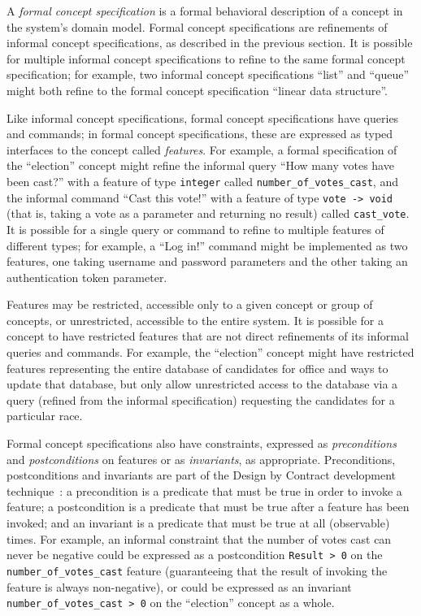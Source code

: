 A \emph{formal concept specification} is a formal behavioral
description of a concept in the system's domain model. Formal concept
specifications are refinements of informal concept specifications, as
described in the previous section. It is possible for multiple
informal concept specifications to refine to the same formal concept
specification; for example, two informal concept specifications
``list'' and ``queue'' might both refine to the formal concept
specification ``linear data structure''.

Like informal concept specifications, formal concept specifications
have queries and commands; in formal concept specifications, these are
expressed as typed interfaces to the concept called
\emph{features}. For example, a formal specification of the
``election'' concept might refine the informal query ``How many votes
have been cast?'' with a feature of type \texttt{integer} called
\texttt{number\_of\_votes\_cast}, and the informal command ``Cast this
vote!'' with a feature of type \texttt{vote -> void} (that is, taking
a vote as a parameter and returning no result) called
\texttt{cast\_vote}. It is possible for a single query or command to
refine to multiple features of different types; for example, a ``Log
in!''  command might be implemented as two features, one taking
username and password parameters and the other taking an
authentication token parameter.

Features may be restricted, accessible only to a given concept or
group of concepts, or unrestricted, accessible to the entire
system. It is possible for a concept to have restricted features that
are not direct refinements of its informal queries and commands. For
example, the ``election'' concept might have restricted features
representing the entire database of candidates for office and ways to
update that database, but only allow unrestricted access to the
database via a query (refined from the informal specification)
requesting the candidates for a particular race.

Formal concept specifications also have constraints, expressed as
\emph{preconditions} and \emph{postconditions} on features or as
\emph{invariants}, as appropriate. Preconditions, postconditions and
invariants are part of the Design by Contract development
technique~\cite{OOSC}: a precondition is a predicate that must be true
in order to invoke a feature; a postcondition is a predicate that must
be true after a feature has been invoked; and an invariant is a
predicate that must be true at all (observable) times. For example, an
informal constraint that the number of votes cast can never be
negative could be expressed as a postcondition \texttt{Result > 0} on
the \texttt{number\_of\_votes\_cast} feature (guaranteeing that the
result of invoking the feature is always non-negative), or could be
expressed as an invariant \texttt{number\_of\_votes\_cast > 0} on the
``election'' concept as a whole.

